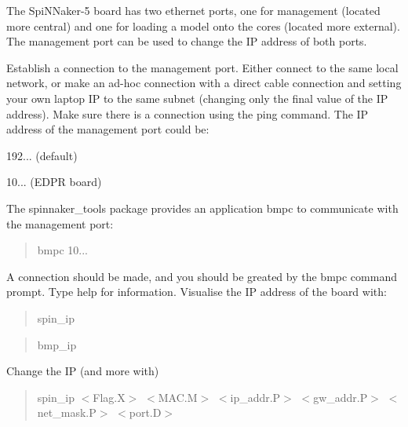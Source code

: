 The Spi\+N\+Naker-\/5 board has two ethernet ports, one for management (located more central) and one for loading a model onto the cores (located more external). The management port can be used to change the IP address of both ports.


\begin{DoxyItemize}
\item Establish a connection to the management port. Either connect to the same local network, or make an ad-\/hoc connection with a direct cable connection and setting your own laptop IP to the same subnet (changing only the final value of the IP address). Make sure there is a connection using the {\ttfamily ping} command. The IP address of the management port could be\+:
\begin{DoxyItemize}
\item 192... (default)
\item 10... (E\+D\+PR board)
\end{DoxyItemize}
\item The spinnaker\+\_\+tools package provides an application {\ttfamily bmpc} to communicate with the management port\+:
\end{DoxyItemize}

\begin{quote}
bmpc 10... \end{quote}



\begin{DoxyItemize}
\item A connection should be made, and you should be greated by the bmpc command prompt. Type {\ttfamily help} for information. Visualise the IP address of the board with\+:
\end{DoxyItemize}

\begin{quote}
spin\+\_\+ip \end{quote}


\begin{quote}
bmp\+\_\+ip \end{quote}



\begin{DoxyItemize}
\item Change the IP (and more with)
\end{DoxyItemize}

\begin{quote}
spin\+\_\+ip $<$Flag.\+X$>$ $<$M\+A\+C.\+M$>$ $<$ip\+\_\+addr.\+P$>$ $<$gw\+\_\+addr.\+P$>$ $<$net\+\_\+mask.\+P$>$ $<$port.\+D$>$ \end{quote}



